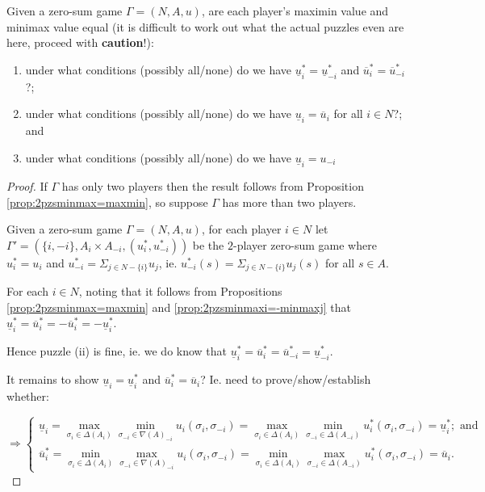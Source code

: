 	\begin{puzzle}
		Given a zero-sum game $\Gamma = (N, A, u)$, are each player's maximin value and minimax value equal (it is difficult to work out what the actual puzzles even are here, proceed with \textbf{caution}!):
		\begin{enumerate}
			\item under what conditions (possibly all/none) do we have $\underline{u}^*_i = \underline{u}^*_{-i}$ and $\overline{u}^*_i = \overline{u}^*_{-i}$?;
			\item under what conditions (possibly all/none) do we have $\underline{u}_i = \overline{u}_i$ for all $i \in N$?; and
			\item under what conditions (possibly all/none) do we have $\underline{u}_i = u_{-i}$
		\end{enumerate}
		
		\begin{proof}
			If $\Gamma$ has only two players then the result follows from Proposition \ref{prop:2pzsminmax=maxmin}, so suppose $\Gamma$ has more than two players.
		
			Given a zero-sum game $\Gamma = (N, A, u)$, for each player $i \in N$ let $\Gamma' = (\{i, -i\}, A_i\times{A_{-i}}, (u^*_i, u^*_{-i}))$ be the $2$-player zero-sum game where $u^*_i = u_i$ and $u^*_{-i} = \Sigma_{j \in N-\{i\}}u_j$, ie. $u^*_{-i}(s) = \Sigma_{j \in N-\{i\}}u_j(s)$ for all $s \in A$.
			
			For each $i \in N$, noting that it follows from Propositions \ref{prop:2pzsminmax=maxmin} and \ref{prop:2pzsminmaxi=-minmaxj} that $\underline{u}^*_i = \overline{u}^*_i = - \overline{u}^*_i = - \underline{u}^*_i$. %
			
			Hence puzzle (ii) is fine, ie. we do know that $\underline{u}^*_i = \overline{u}^*_i = \overline{u}^*_{-i} = \underline{u}^*_{-i}$.
			
			It remains to show $\underline{u}_i = \underline{u}^*_i$ and $\overline{u}^*_i = \overline{u}_i$? Ie. need to prove/show/establish whether:
			
			\[ \Rightarrow
				\begin{cases}
					\displaystyle \underline{u}_i = \max_{\sigma_i \in \Delta(A_i)}\min_{\sigma_{-i} \in \nabla(A)_{-i}} u_i(\sigma_i, \sigma_{-i}) = \max_{\sigma_i \in \Delta(A_i)}\min_{\sigma_{-i} \in \Delta(A_{-i})} u^*_i(\sigma_i, \sigma_{-i}) = \underline{u}^*_i; \text{ and} & \\
					\displaystyle \overline{u}^*_i = \min_{\sigma_i \in \Delta(A_i)}\max_{\sigma_{-i} \in \nabla(A)_{-i}} u_i(\sigma_i, \sigma_{-i}) = \min_{\sigma_i \in \Delta(A_i)}\max_{\sigma_{-i} \in \Delta(A_{-i})} u^*_i(\sigma_i, \sigma_{-i}) = \overline{u}_i. &
				\end{cases}
			\]
		\end{proof}
	\end{puzzle}
	
